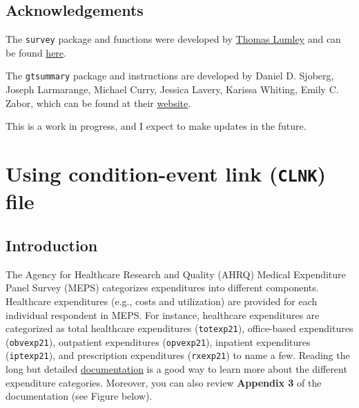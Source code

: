 \documentclass[
]{book}
\begin{document}
\hypertarget{acknowledgements-2}{%
\section{Acknowledgements}\label{acknowledgements-2}}

The \texttt{survey} package and functions were developed by \href{https://profiles.auckland.ac.nz/t-lumley}{Thomas Lumley} and can be found \href{https://www.rdocumentation.org/packages/survey/versions/4.1-1}{here}.

The \texttt{gtsummary} package and instructions are developed by Daniel D. Sjoberg, Joseph Larmarange, Michael Curry, Jessica Lavery, Karissa Whiting, Emily C. Zabor, which can be found at their \href{https://www.danieldsjoberg.com/gtsummary/reference/tbl_svysummary.html}{website}.

This is a work in progress, and I expect to make updates in the future.

\hypertarget{clnk}{%
\chapter{\texorpdfstring{Using condition-event link (\texttt{CLNK}) file}{Using condition-event link (CLNK) file}}\label{clnk}}

\hypertarget{introduction-3}{%
\section{Introduction}\label{introduction-3}}

The Agency for Healthcare Research and Quality (AHRQ) Medical Expenditure Panel Survey (MEPS) categorizes expenditures into different components. Healthcare expenditures (e.g., costs and utilization) are provided for each individual respondent in MEPS. For instance, healthcare expenditures are categorized as total healthcare expenditures (\texttt{totexp21}), office-based expenditures (\texttt{obvexp21}), outpatient expenditures (\texttt{opvexp21}), inpatient expenditures (\texttt{iptexp21}), and prescription expenditures (\texttt{rxexp21}) to name a few. Reading the long but detailed \href{https://meps.ahrq.gov/data_stats/download_data/pufs/h233/h233doc.shtml}{documentation} is a good way to learn more about the different expenditure categories. Moreover, you can also review \textbf{Appendix 3} of the documentation (see Figure below).
\end{document}
